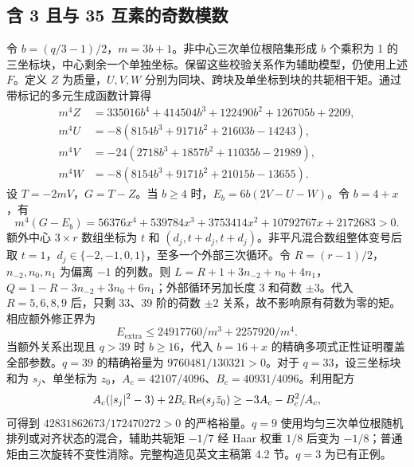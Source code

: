 \documentclass[UTF8,fontset=none,11pt]{ctexart}
\begin{document}
\subsection{含 3 且与 35 互素的奇数模数}
令 $b=(q/3-1)/2$，$m=3b+1$。非中心三次单位根陪集形成 $b$ 个乘积为 1 的三坐标块，中心剩余一个单独坐标。保留这些校验关系作为辅助模型，仍使用上述 $F$。定义 $Z$ 为质量，$U,V,W$ 分别为同块、跨块及单坐标到块的共轭相干矩。通过带标记的多元生成函数计算得
\begin{align*}m^4 Z&=335016b^4+414504b^3+122490b^2+126705b+2209,\\m^4 U&=-8(8154b^3+9171b^2+21603b-14243),\\m^4 V&=-24(2718b^3+1857b^2+11035b-21989),\\m^4 W&=-8(8154b^3+9171b^2+21015b-13655).
\end{align*}
设 $T=-2mV$，$G=T-Z$。当 $b\ge4$ 时，$E_b=6b(2V-U-W)$。令 $b=4+x$，有
\[m^4(G-E_b)=56376x^4+539784x^3+3753414x^2+10792767x+2172683>0.\]
额外中心 $3\times r$ 数组坐标为 $t$ 和 $(d_j,t+d_j,t+d_j)$。非平凡混合数组整体变号后取 $t=1$，$d_j\in\{-2,-1,0,1\}$，至多一个外部三次循环。令 $R=(r-1)/2$，$n_{-2},n_0,n_1$ 为偏离 $-1$ 的列数。则 $L=R+1+3n_{-2}+n_0+4n_1$，$Q=1-R-3n_{-2}+3n_0+6n_1$；外部循环另加长度 3 和荷数 $\pm3$。代入 $R=5,6,8,9$ 后，只剩 33、39 阶的荷数 $\pm2$ 关系，故不影响原有荷数为零的矩。相应额外修正界为
\[E_{\mathrm{extra}}\le24917760/m^3+2257920/m^4.\]
当额外关系出现且 $q>39$ 时 $b\ge16$，代入 $b=16+x$ 的精确多项式正性证明覆盖全部参数。$q=39$ 的精确裕量为 $9760481/130321>0$。对于 $q=33$，设三坐标块和为 $s_j$、单坐标为 $z_0$，$A_c=42107/4096$、$B_c=40931/4096$。利用配方
\[A_c(|s_j|^2-3)+2B_c\operatorname{Re}(s_j\bar z_0)\ge-3A_c-B_c^2/A_c,\]
可得到 $42831862673/172470272>0$ 的严格裕量。$q=9$ 使用均匀三次单位根随机排列或对齐状态的混合，辅助共轭矩 $-1/7$ 经 Haar 权重 $1/8$ 后变为 $-1/8$；普通矩由三次旋转不变性消除。完整构造见英文主稿第 4.2 节。$q=3$ 为已有正例。
\end{document}
